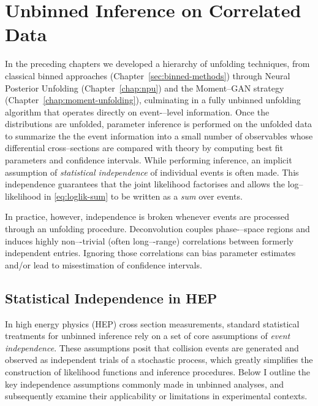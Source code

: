 \chapter{Unbinned Inference on Correlated Data}
\label{chap:unbinned_correlations}
In the preceding chapters we developed a hierarchy of unfolding techniques, from classical binned approaches (Chapter~\ref{sec:binned-methods}) through Neural Posterior Unfolding (Chapter~\ref{chap:npu}) and the Moment–GAN strategy (Chapter~\ref{chap:moment-unfolding}), culminating in a fully
{unbinned} unfolding algorithm that operates directly on event-–level information.
%
Once the distributions are unfolded, parameter inference is performed on the unfolded data to summarize the the event information into a small number of observables whose differential cross--sections are compared with theory by computing best fit parameters and confidence intervals.
%
While performing inference, an implicit assumption of \emph{statistical independence} of individual events is often made.
%
This independence guarantees that the joint likelihood factorises and allows the log–likelihood in \cref{eq:loglik-sum} to be written as a \textit{sum} over events.

In practice, however, independence is {broken} whenever events are processed through an unfolding procedure.
%
Deconvolution couples phase-–space regions and induces highly non–-trivial (often long–-range) correlations between formerly independent entries.
%
Ignoring those correlations can bias parameter estimates and/or lead to misestimation of confidence intervals.
\section{Statistical Independence in HEP}
\label{sec:independence-assumptions}
    In high energy physics (HEP) cross section measurements, standard statistical treatments for unbinned inference rely on a set of core assumptions of \emph{event independence}. 
    These assumptions posit that collision events are generated and observed as independent trials of a stochastic process, which greatly simplifies the construction of likelihood functions and inference procedures.
    Below I outline the key independence assumptions commonly made in unbinned analyses, and subsequently examine their applicability or limitations in experimental contexts.
